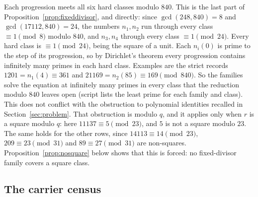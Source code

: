 Each progression meets all six hard classes modulo $840$. This is the last part of Proposition~\ref{prop:fixeddivisor}, and directly: since $\gcd(248,840)=8$ and $\gcd(17112,840)=24$, the numbers $n_1,n_2$ run through every class $\equiv1\pmod8$ modulo $840$, and $n_3,n_4$ through every class $\equiv1\pmod{24}$. Every hard class is $\equiv1\pmod{24}$, being the square of a unit.
Each $n_i(0)$ is prime to the step of its progression, so by Dirichlet's theorem every progression contains infinitely many primes in each hard class. Examples are the strict records $1201=n_1(4)\equiv361$ and $21169=n_2(85)\equiv169\pmod{840}$.
So the families solve the equation at infinitely many primes in every class that the reduction modulo $840$ leaves open (script  lists the least prime for each family and class).
This does not conflict with the obstruction to polynomial identities recalled in Section~\ref{sec:problem}. That obstruction is modulo $q$, and it applies only when $r$ is a square modulo $q$: here $11137\equiv5\pmod{23}$, and $5$ is not a square modulo $23$. The same holds for the other rows, since $14113\equiv14\pmod{23}$, $209\equiv23\pmod{31}$ and $89\equiv27\pmod{31}$ are non-squares. Proposition~\ref{prop:nosquare} below shows that this is forced: no fixed-divisor family covers a square class.

\subsection{The carrier census}\label{ssec:census}

